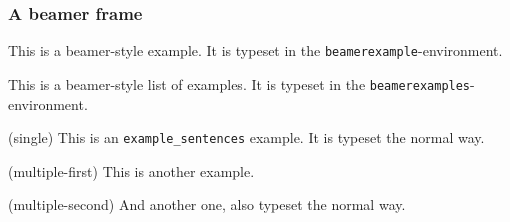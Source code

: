 \documentclass{beamer}
\begin{document}
	\begin{frame}
		\frametitle{A beamer frame}
		\begin{beamerexample}
			This is a beamer-style example. It is typeset in the \texttt{beamerexample}-environment.
		 \end{beamerexample}
		\begin{beamerexamples}
			This is a beamer-style list of examples.  It is typeset in the \texttt{beamerexamples}-environment.
		\end{beamerexamples}
		
		\begin{example}
			\item(single) This is an \texttt{example\_sentences} example. It is typeset the normal way.
		\end{example}
		\begin{examples}
		 	 \item(multiple-first) This is another example.
		 	 \item(multiple-second) And another one, also typeset the normal way.
		\end{examples}
	\end{frame}
\end{document}
